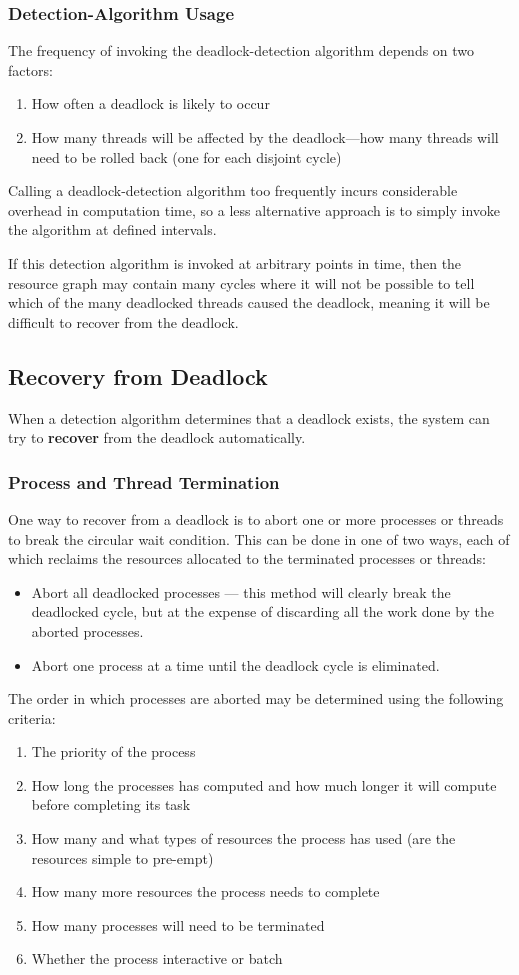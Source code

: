 \documentclass{article}
\begin{document}
\subsubsection{Detection-Algorithm Usage}
The frequency of invoking the deadlock-detection algorithm depends on
two factors:
\begin{enumerate}
    \item How often a deadlock is likely to occur
    \item How many threads will be affected by the deadlock---how many
          threads will need to be rolled back (one for each disjoint
          cycle)
\end{enumerate}
Calling a deadlock-detection algorithm too frequently incurs
considerable overhead in computation time, so a less alternative approach
is to simply invoke the algorithm at defined intervals.

If this detection algorithm is invoked at arbitrary points in time,
then the resource graph may contain many cycles where it will not be
possible to tell which of the many deadlocked threads caused the
deadlock, meaning it will be difficult to recover from the deadlock.
\subsection{Recovery from Deadlock}
When a detection algorithm determines that a deadlock exists, the
system can try to \textbf{recover} from the deadlock automatically.
\subsubsection{Process and Thread Termination}
One way to recover from a deadlock is to abort one or more processes or
threads to break the circular wait condition. This can be done in one
of two ways, each of which reclaims the resources allocated to the
terminated processes or threads:
\begin{itemize}
    \item Abort all deadlocked processes --- this method will clearly
          break the deadlocked cycle, but at the expense of discarding
          all the work done by the aborted processes.
    \item Abort one process at a time until the deadlock cycle is
          eliminated.
\end{itemize}
The order in which processes are aborted may be determined using the following criteria:
\begin{enumerate}
    \item The priority of the process
    \item How long the processes has computed and how much longer it
          will compute before completing its task
    \item How many and what types of resources the process has used
          (are the resources simple to pre-empt)
    \item How many more resources the process needs to complete
    \item How many processes will need to be terminated
    \item Whether the process interactive or batch
\end{enumerate}
\end{document}

